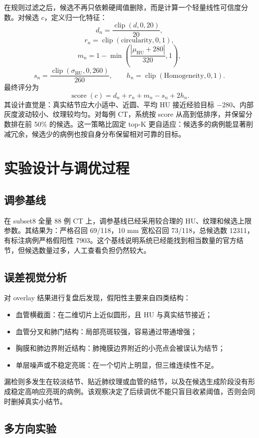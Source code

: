 \documentclass[UTF8,zihao=-4,fontset=none]{ctexart}
\begin{document}
在规则过滤之后，候选不再只依赖硬阈值删除，而是计算一个轻量线性可信度分数。对候选 \(c\)，定义归一化特征：
\[
d_n=\frac{\operatorname{clip}(d,0,20)}{20},
\]
\[
r_n=\operatorname{clip}(\text{circularity},0,1),
\]
\[
m_n=1-\min\left(\frac{|\mu_{\text{HU}}+280|}{320},1\right),
\]
\[
s_n=\frac{\operatorname{clip}(\sigma_{\text{HU}},0,260)}{260},
\qquad
h_n=\operatorname{clip}(\text{Homogeneity},0,1).
\]
最终评分为
\[
\operatorname{score}(c)=d_n+r_n+m_n-s_n+2h_n.
\]
其设计直觉是：真实结节应大小适中、近圆、平均 HU 接近经验目标 \(-280\)、内部灰度波动较小、纹理较均匀。对每例 CT，系统按 score 从高到低排序，并保留分数排在前 50\% 的候选。这一策略比固定 top-K 更自适应：候选多的病例能显著削减冗余，候选少的病例也按自身分布保留相对可靠的目标。

\section{实验设计与调优过程}

\subsection{调参基线}

在 subset8 全量 88 例 CT 上，调参基线已经采用较合理的 HU、纹理和候选上限参数。其结果为：严格召回 69/118，10 mm 宽松召回 73/118，总候选数 12311，有标注病例严格假阳性 7903。这个基线说明系统已经能找到相当数量的官方结节，但候选数量过多，人工查看负担仍然较大。

\subsection{误差视觉分析}

对 overlay 结果进行复盘后发现，假阳性主要来自四类结构：
\begin{itemize}
  \item 血管横截面：在二维切片上近似圆形，且 HU 与真实结节接近；
  \item 血管分叉和肺门结构：局部亮斑较强，容易通过带通增强；
  \item 胸膜和肺边界附近结构：肺掩膜边界附近的小亮点会被误认为结节；
  \item 单层噪声或不稳定亮斑：在一个切片上明显，但三维连续性不足。
\end{itemize}
漏检则多发生在较淡结节、贴近肺纹理或血管的结节，以及在候选生成阶段没有形成稳定高响应亮斑的病例。该观察决定了后续调优不能只盲目收紧阈值，否则会同时删掉真实小结节。

\subsection{多方向实验}
\end{document}
